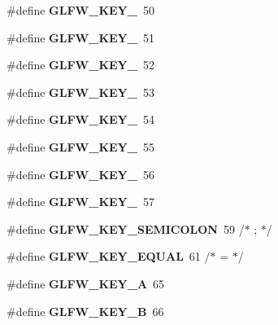 \begin{DoxyCompactItemize}
\#define {\bfseries G\+L\+F\+W\+\_\+\+K\+E\+Y\+\_}~50
\item 
\mbox{\label{group__keys_ga812f0273fe1a981e1fa002ae73e92271}} 
\#define {\bfseries G\+L\+F\+W\+\_\+\+K\+E\+Y\+\_}~51
\item 
\mbox{\label{group__keys_ga9e14b6975a9cc8f66cdd5cb3d3861356}} 
\#define {\bfseries G\+L\+F\+W\+\_\+\+K\+E\+Y\+\_}~52
\item 
\mbox{\label{group__keys_ga4d74ddaa5d4c609993b4d4a15736c924}} 
\#define {\bfseries G\+L\+F\+W\+\_\+\+K\+E\+Y\+\_}~53
\item 
\mbox{\label{group__keys_ga9ea4ab80c313a227b14d0a7c6f810b5d}} 
\#define {\bfseries G\+L\+F\+W\+\_\+\+K\+E\+Y\+\_}~54
\item 
\mbox{\label{group__keys_gab79b1cfae7bd630cfc4604c1f263c666}} 
\#define {\bfseries G\+L\+F\+W\+\_\+\+K\+E\+Y\+\_}~55
\item 
\mbox{\label{group__keys_gadeaa109a0f9f5afc94fe4a108e686f6f}} 
\#define {\bfseries G\+L\+F\+W\+\_\+\+K\+E\+Y\+\_}~56
\item 
\mbox{\label{group__keys_ga2924cb5349ebbf97c8987f3521c44f39}} 
\#define {\bfseries G\+L\+F\+W\+\_\+\+K\+E\+Y\+\_}~57
\item 
\mbox{\label{group__keys_ga84233de9ee5bb3e8788a5aa07d80af7d}} 
\#define {\bfseries G\+L\+F\+W\+\_\+\+K\+E\+Y\+\_\+\+S\+E\+M\+I\+C\+O\+L\+ON}~59  /$\ast$ ; $\ast$/
\item 
\mbox{\label{group__keys_gae1a2de47240d6664423c204bdd91bd17}} 
\#define {\bfseries G\+L\+F\+W\+\_\+\+K\+E\+Y\+\_\+\+E\+Q\+U\+AL}~61  /$\ast$ = $\ast$/
\item 
\mbox{\label{group__keys_ga03e842608e1ea323370889d33b8f70ff}} 
\#define {\bfseries G\+L\+F\+W\+\_\+\+K\+E\+Y\+\_\+A}~65
\item 
\mbox{\label{group__keys_ga8e3fb647ff3aca9e8dbf14fe66332941}} 
\#define {\bfseries G\+L\+F\+W\+\_\+\+K\+E\+Y\+\_\+B}~66

\end{DoxyCompactItemize}
